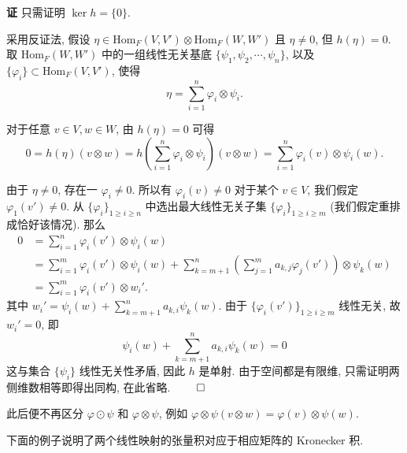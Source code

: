 \hspace{-2em}\textbf{证} \hspace{0.5em} 只需证明 $\ker{h} = \{0\}$. 

采用反证法, 假设 $\eta \in \text{Hom}_F(V,V') \otimes \text{Hom}_F(W,W')$ 且 $\eta \neq 0$, 但 $h(\eta) = 0$. 取 $\text{Hom}_F(W,W')$ 中的一组线性无关基底 $\{\psi_1, \psi_2, \cdots, \psi_n\}$, 以及 $\{\varphi_i\} \subset \text{Hom}_F(V,V')$, 使得
\begin{equation*}
    \eta = \sum_{i=1}^n \varphi_i \otimes \psi_i.
\end{equation*}

对于任意 $v \in V, w \in W$, 由 $h(\eta) = 0$ 可得
\begin{equation*}
    0 = h(\eta)(v \otimes w) =h \left( \sum_{i=1}^n \varphi_i \otimes \psi_i \right)(v \otimes w)= \sum_{i=1}^n \varphi_i(v) \otimes \psi_i(w).
\end{equation*}

由于 $\eta \ne 0$, 存在一 $\varphi_i \ne 0$. 所以有 $\varphi_i(v) \ne 0$ 对于某个 $v \in V$, 我们假定 $\varphi_1(v')\ne 0$. 从 $\{\varphi_i\}_{1 \ge i \ge n}$ 中选出最大线性无关子集 $\{\varphi_i\}_{1 \ge i \ge m}$ (我们假定重排成恰好该情况). 那么
\begin{align*}
    0 &= \sum_{i=1}^n \varphi_i(v') \otimes \psi_i(w) \\
    &= \sum_{i=1}^m \varphi_i(v') \otimes \psi_i(w) + \sum_{k=m+1}^n \left(\sum_{j=1}^m a_{k,j}\varphi_j(v') \right) \otimes \psi_k(w) \\
    &= \sum_{i=1}^m \varphi_i(v') \otimes w_i'.
\end{align*}
其中 $w_i' = \psi_i(w) + \sum_{k=m+1}^n a_{k,i}\psi_k(w)$. 由于 $\{\varphi_i(v')\}_{1 \ge i \ge m}$ 线性无关, 故 $w_i' = 0$, 即
\begin{equation*}
    \psi_i(w) + \sum_{k=m+1}^n a_{k,i}\psi_k(w) = 0
\end{equation*}
这与集合 $\{\psi_i\}$ 线性无关性矛盾, 因此 $h$ 是单射. 由于空间都是有限维, 只需证明两侧维数相等即得出同构, 在此省略. \hfill\(\qed\)

此后便不再区分 $\varphi \odot \psi$ 和 $\varphi \otimes \psi$, 例如 $\varphi \otimes \psi(v \otimes w) = \varphi(v) \otimes \psi(w)$.

下面的例子说明了两个线性映射的张量积对应于相应矩阵的 Kronecker 积.

\vspace{0.6em}

